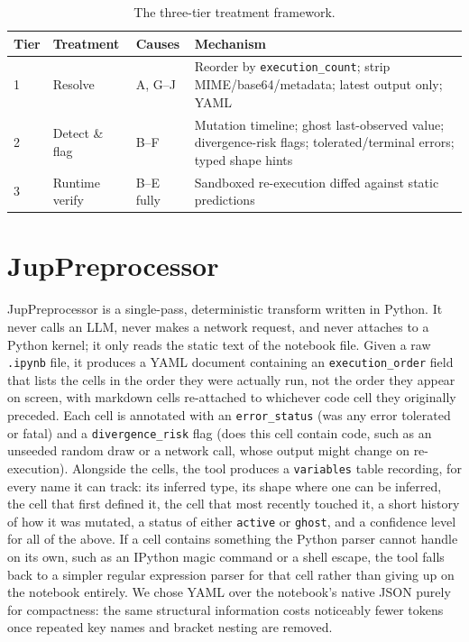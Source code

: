 \documentclass[11pt]{article}
\begin{document}
\begin{table}[t]
\centering\small
\begin{tabular}{@{}lllp{6.2cm}@{}}
\toprule
Tier & Treatment & Causes & Mechanism \\
\midrule
1 & Resolve & A, G--J & Reorder by \texttt{execution\_count}; strip
MIME/base64/metadata; latest output only; YAML \\
2 & Detect \& flag & B--F & Mutation timeline; ghost last-observed value;
divergence-risk flags; tolerated/terminal errors; typed shape hints \\
3 & Runtime verify & B--E fully & Sandboxed re-execution diffed against static
predictions \\
\bottomrule
\end{tabular}
\caption{The three-tier treatment framework.}
\label{tab:tiers}
\end{table}

\section{JupPreprocessor}
\label{sec:method}
JupPreprocessor is a single-pass, deterministic transform written in
Python. It never calls an LLM, never makes a network request, and never
attaches to a Python kernel; it only reads the static text of the
notebook file. Given a raw \texttt{.ipynb} file, it produces a YAML
document containing an \texttt{execution\_order} field that lists the
cells in the order they were actually run, not the order they
appear on screen, with markdown cells re-attached to whichever code cell
they originally preceded. Each cell is annotated with an
\texttt{error\_status} (was any error tolerated or fatal) and a
\texttt{divergence\_risk} flag (does this cell contain code, such as an
unseeded random draw or a network call, whose output might change on
re-execution). Alongside the cells, the tool produces a
\texttt{variables} table recording, for every name it can track: its
inferred type, its shape where one can be inferred, the cell that first
defined it, the cell that most recently touched it, a short history of
how it was mutated, a status of either \texttt{active} or \texttt{ghost},
and a confidence level for all of the above. If a cell contains something
the Python parser cannot handle on its own, such as an IPython magic
command or a shell escape, the tool falls back to a simpler regular
expression parser for that cell rather than giving up on the notebook
entirely. We chose YAML over the notebook's native JSON purely for
compactness: the same structural information costs noticeably fewer
tokens once repeated key names and bracket nesting are removed.
\end{document}
